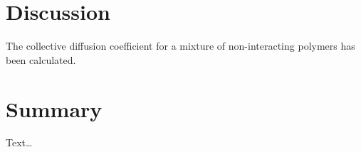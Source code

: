 \documentclass[bachelor,       %
               twoside,        %
               BCOR10mm,       %
                ngerman,english  %
               ]{GAUBM}
\begin{document}
\chapter{Discussion}

The collective diffusion coefficient for a mixture of non-interacting polymers has been calculated.

\chapter{Summary}
Text\dots




 


\end{document}
